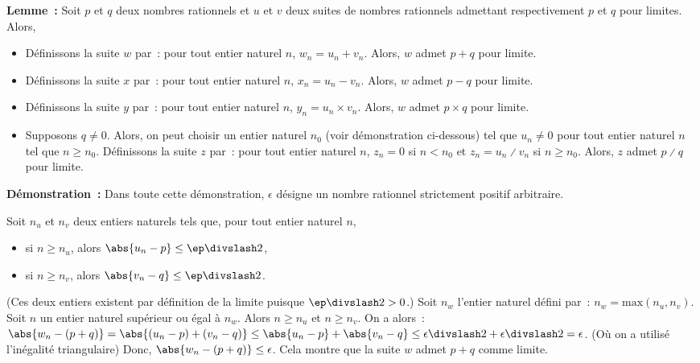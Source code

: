 \noindent\textbf{Lemme :} Soit $p$ et $q$ deux nombres rationnels et $u$ et $v$ deux suites de nombres rationnels admettant respectivement $p$ et $q$ pour limites. 
    Alors, 
    \begin{itemize}[nosep]
        \item Définissons la suite $w$ par : pour tout entier naturel $n$, $w_n = u_n + v_n$. 
            Alors, $w$ admet $p + q$ pour limite.
        \item Définissons la suite $x$ par : pour tout entier naturel $n$, $x_n = u_n - v_n$. 
            Alors, $w$ admet $p - q$ pour limite.
        \item Définissons la suite $y$ par : pour tout entier naturel $n$, $y_n = u_n \times v_n$. 
            Alors, $w$ admet $p \times q$ pour limite.
        \item Supposons $q \neq 0$. 
            Alors, on peut choisir un entier naturel $n_0$ (voir démonstration ci-dessous) tel que $u_n \neq 0$ pour tout entier naturel $n$ tel que $n \geq n_0$.
            Définissons la suite $z$ par : pour tout entier naturel $n$, $z_n = 0$ si $n < n_0$ et $z_n = u_n \divslash v_n$ si $n \geq n_0$.
            Alors, $z$ admet $p \divslash q$ pour limite.
    \end{itemize}

\medskip

\noindent\textbf{Démonstration :}
    Dans toute cette démonstration, $\epsilon$ désigne un nombre rationnel strictement positif arbitraire.

    Soit $n_u$ et $n_v$ deux entiers naturels tels que, pour tout entier naturel $n$, 
    \begin{itemize}[nosep]
        \item si $n \geq n_u$, alors $\abs{u_n - p} \leq \ep \divslash 2$, 
        \item si $n \geq n_v$, alors $\abs{v_n - q} \leq \ep \divslash 2$. 
    \end{itemize}
    (Ces deux entiers existent par définition de la limite puisque $\ep \divslash 2 > 0$.)
    Soit $n_w$ l'entier naturel défini par : $n_w = \mathrm{max}(n_u, n_v)$. 
    Soit $n$ un entier naturel supérieur ou égal à $n_w$. 
    Alors $n \geq n_u$ et $n \geq n_v$. 
    On a alors : $\abs{w_n - (p+q)} = \abs{(u_n-p) + (v_n-q)} \leq \abs{u_n-p} + \abs{v_n-q} \leq \epsilon \divslash 2 + \epsilon \divslash 2 = \epsilon$.
    (Où on a utilisé l'inégalité triangulaire)
    Donc, $\abs{w_n - (p+q)} \leq \epsilon$.
    Cela montre que la suite $w$ admet $p+q$ comme limite.

